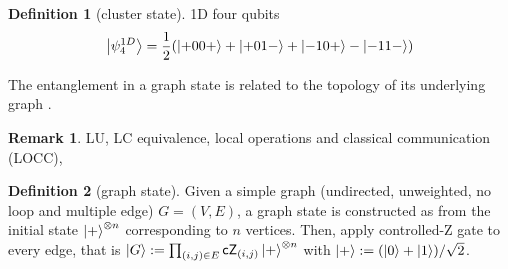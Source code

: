 \documentclass[
aps,
pra,
twocolumn,
floatfix,
]{revtex4-2}
\theoremstyle{plain}
\newtheorem{question}{Question}
\theoremstyle{definition}
\newtheorem{definition}{Definition}
\newtheorem{example}{Example}
\newtheorem{remark}{Remark}
\newcommand{\U}{U}
\begin{document}
\begin{definition}[cluster state]\label{def:cluster_state}
	1D four qubits
	\begin{equation}
		\ket{\psi_4^{1D}} = \frac{1}{2} \qty(
			\ket{+00+} + \ket{+01-} + \ket{-10+} - \ket{-11-}
		)
	\end{equation}
\end{definition}
	The entanglement in a graph state is related to the topology of its underlying graph \cite{heinEntanglementGraphStates2006}.
\begin{remark}
	LU, LC equivalence, local operations and classical communication (LOCC), 
\end{remark}
\begin{definition}[graph state]\label{def:graph_state}
	Given a simple graph (undirected, unweighted, no loop and multiple edge) $G=(V,E)$, a graph state is constructed as 
	from the initial state $\ket{+}^{\otimes n}$ corresponding to $n$ vertices.
	Then, apply controlled-Z gate to every edge, that is 
	$\ket{G}:=\prod_{(i,j)\in E}\textsf{cZ}_{(i,j)} \ket{+}^{\otimes n}$
	with $\ket{+}: = (\ket{0}+\ket{1})/\sqrt{2}$.
\end{definition}
\end{document}
